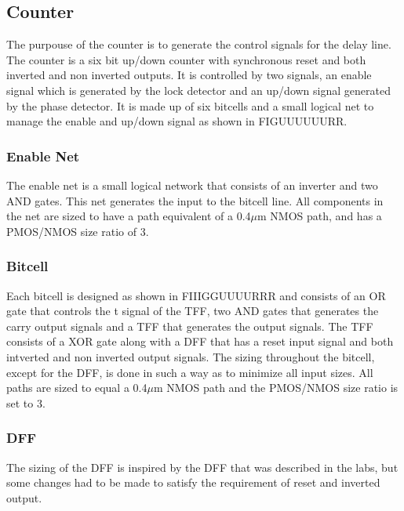 \documentclass[a4paper,12pt]{article} \usepackage{graphicx}
\begin{document}
\subsection{Counter}
The purpouse of the counter is to generate the control signals for the delay line.
The counter is a six bit up/down counter with synchronous reset and both
inverted and non inverted outputs. It is controlled by two signals, an enable
signal which is generated by the lock detector and an up/down signal generated
by the phase detector. It is made up of six bitcells and a small logical net to
manage the enable and up/down signal as shown in FIGUUUUUURR.
\subsubsection{Enable Net}
The enable net is a small logical network that consists of an inverter and two
AND gates. This net generates the input to the bitcell line.
All components in the net are sized to have a path equivalent of a 0.4$\mu$m NMOS
path, and has a PMOS/NMOS size ratio of 3.
\subsubsection{Bitcell}
Each bitcell is designed as shown in FIIIGGUUUURRR and consists of an OR gate 
that controls the t signal of the TFF, two AND gates that generates the carry 
output signals and a TFF that generates the output signals.
The TFF consists of a XOR gate along with a DFF that has a reset input signal and
both intverted and non inverted output signals.
The sizing throughout the bitcell, except for the DFF, is done in such a way as 
to minimize all input sizes. All paths are sized to equal a 0.4$\mu$m NMOS path
and the PMOS/NMOS size ratio is set to 3.
\subsubsection{DFF}
The sizing of the DFF is inspired by the DFF that was described in the labs, but
some changes had to be made to satisfy the requirement of reset and inverted output.
\end{document}
